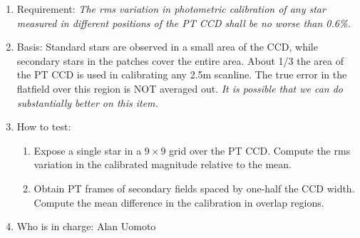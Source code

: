 \begin{enumerate}
   \begin{enumerate}
   \item Requirement:  {\it The rms variation in photometric
calibration of any star measured in different positions of the PT CCD
shall be no worse than 0.6\%.}%
   \item Basis: Standard stars are observed in a small area of the CCD,
	while secondary stars in the patches cover the entire area.  About 1/3
	the area of the PT CCD is used in calibrating any 2.5m scanline.
	The true error in the flatfield over this region 
	is NOT averaged out. {\it It is possible that we can do
	substantially better on this item.}
   \item How to test:
	\begin{enumerate}
	\item Expose a single star in a $9\times9$ grid over the PT CCD.  Compute
	   the rms variation in the calibrated magnitude relative to
	   the mean.
	\item Obtain PT frames of secondary fields spaced by one-half the CCD width.
	Compute the mean difference in the calibration in overlap regions.
	\end{enumerate}
   \item Who is in charge: Alan Uomoto
   \end{enumerate}


\end{enumerate}
